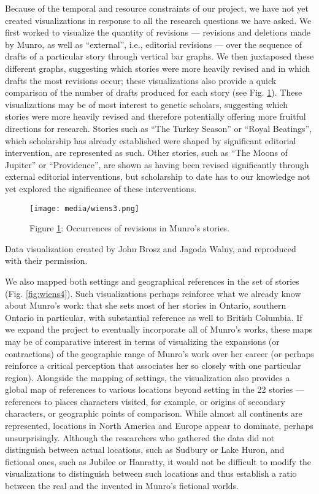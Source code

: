 \documentclass{article}
\begin{document}
Because of the temporal and resource constraints of our project, we have
not yet created visualizations in response to all the research questions
we have asked. We first worked to visualize the quantity of
revisions –– revisions and deletions made by Munro, as well as
``external'', i.e., editorial revisions –– over the sequence of drafts of
a particular story through vertical bar graphs. We then juxtaposed these
different graphs, suggesting which stories were more heavily revised and
in which drafts the most revisions occur; these visualizations also
provide a quick comparison of the number of drafts produced for each
story (see Fig. \ref{fig:wiens3}). These visualizations may be of most interest to
genetic scholars, suggesting which stories were more heavily revised and
therefore potentially offering more fruitful directions for research.
Stories such as ``The Turkey Season'' or ``Royal Beatings'', which
scholarship has already established were shaped by significant editorial
intervention, are represented as such. Other stories, such as ``The
Moons of Jupiter'' or ``Providence'', are shown as having been revised
significantly through external editorial interventions, but scholarship
to date has to our knowledge not yet explored the significance of these
interventions.

\begin{figure}[t]
    \centering
    \texttt{[image: media/wiens3.png]}
    \caption{Figure \ref{fig:wiens3}: Occurrences of revisions in Munro's stories.}
    \label{fig:wiens3}
\end{figure}

Data visualization created by John Brosz and Jagoda Walny, and reproduced with their permission.

We also mapped both settings and geographical references in the set of
stories (Fig. \ref{fig:wiens4}). Such visualizations perhaps reinforce what we
already know about Munro's work: that she sets most of her stories in
Ontario, southern Ontario in particular, with substantial reference as
well to British Columbia. If we expand the project to eventually
incorporate all of Munro's works, these maps may be of comparative
interest in terms of visualizing the expansions (or contractions) of the
geographic range of Munro's work over her career (or perhaps reinforce a
critical perception that associates her so closely with one particular
region). Alongside the mapping of settings, the visualization also
provides a global map of references to various locations beyond setting
in the 22 stories –– references to places characters visited, for
example, or origins of secondary characters, or geographic points of
comparison. While almost all continents are represented, locations in
North America and Europe appear to dominate, perhaps unsurprisingly.
Although the researchers who gathered the data did not distinguish
between actual locations, such as Sudbury or Lake Huron, and fictional
ones, such as Jubilee or Hanratty, it would not be difficult to modify
the visualizations to distinguish between such locations and thus
establish a ratio between the real and the invented in Munro's fictional
worlds.
\end{document}
